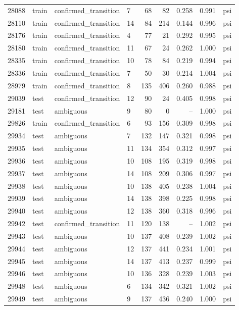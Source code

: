 \begin{longtable}{rlllrrrrl}
28088 & train & confirmed\_transition & 7 & 68 & 82 & 0.258 & 0.991 & psi \\
28110 & train & confirmed\_transition & 14 & 84 & 214 & 0.144 & 0.996 & psi \\
28176 & train & confirmed\_transition & 4 & 77 & 21 & 0.292 & 0.995 & psi \\
28180 & train & confirmed\_transition & 11 & 67 & 24 & 0.262 & 1.000 & psi \\
28335 & train & confirmed\_transition & 10 & 78 & 84 & 0.219 & 0.994 & psi \\
28336 & train & confirmed\_transition & 7 & 50 & 30 & 0.214 & 1.004 & psi \\
28979 & train & confirmed\_transition & 8 & 135 & 406 & 0.260 & 0.988 & psi \\
29039 & test & confirmed\_transition & 12 & 90 & 24 & 0.405 & 0.998 & psi \\
29181 & test & ambiguous & 9 & 80 & 0 & -- & 1.000 & psi \\
29826 & train & confirmed\_transition & 6 & 93 & 156 & 0.309 & 0.998 & psi \\
29934 & test & ambiguous & 7 & 132 & 147 & 0.321 & 0.998 & psi \\
29935 & test & ambiguous & 11 & 134 & 354 & 0.312 & 0.997 & psi \\
29936 & test & ambiguous & 10 & 108 & 195 & 0.319 & 0.998 & psi \\
29937 & test & ambiguous & 14 & 108 & 209 & 0.306 & 0.997 & psi \\
29938 & test & ambiguous & 10 & 138 & 405 & 0.238 & 1.004 & psi \\
29939 & test & ambiguous & 14 & 138 & 398 & 0.225 & 0.998 & psi \\
29940 & test & ambiguous & 12 & 138 & 360 & 0.318 & 0.996 & psi \\
29942 & test & confirmed\_transition & 11 & 120 & 138 & -- & 1.002 & psi \\
29943 & test & ambiguous & 10 & 137 & 408 & 0.239 & 1.002 & psi \\
29944 & test & ambiguous & 12 & 137 & 441 & 0.234 & 1.001 & psi \\
29945 & test & ambiguous & 14 & 137 & 413 & 0.237 & 0.999 & psi \\
29946 & test & ambiguous & 10 & 136 & 328 & 0.239 & 1.003 & psi \\
29948 & test & ambiguous & 6 & 134 & 342 & 0.321 & 1.002 & psi \\
29949 & test & ambiguous & 9 & 137 & 436 & 0.240 & 1.000 & psi \\

\end{longtable}
